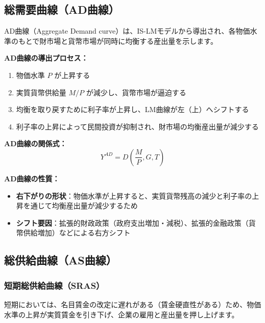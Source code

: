 \documentclass[
  japanese,
  lualatex,
  ja=standard,
  12pt,
  a4paper]{ltjsarticle}
\providecommand{\tightlist}{%
  \setlength{\itemsep}{0pt}\setlength{\parskip}{0pt}}
\begin{document}
\subsection{総需要曲線（AD曲線）}\label{ux7dcfux9700ux8981ux66f2ux7ddaadux66f2ux7dda}

AD曲線（Aggregate Demand
curve）は、IS-LMモデルから導出され、各物価水準のもとで財市場と貨幣市場が同時に均衡する産出量を示します。


\textbf{AD曲線の導出プロセス：}

\begin{enumerate}
\def\labelenumi{\arabic{enumi}.}
\tightlist
\item
  物価水準 \(P\) が上昇する
\item
  実質貨幣供給量 \(M/P\) が減少し、貨幣市場が逼迫する
\item
  均衡を取り戻すために利子率が上昇し、LM曲線が左（上）へシフトする
\item
  利子率の上昇によって民間投資が抑制され、財市場の均衡産出量が減少する
\end{enumerate}


\textbf{AD曲線の関係式：} \[
Y^{AD}=D\left(\frac{M}{P}, G, T\right)
\]


\textbf{AD曲線の性質：}

\begin{itemize}
\tightlist
\item
  \textbf{右下がりの形状}：物価水準が上昇すると、実質貨幣残高の減少と利子率の上昇を通じて均衡産出量が減少するため
\item
  \textbf{シフト要因}：拡張的財政政策（政府支出増加・減税）、拡張的金融政策（貨幣供給増加）などによる右方シフト
\end{itemize}

\subsection{総供給曲線（AS曲線）}\label{ux7dcfux4f9bux7d66ux66f2ux7ddaasux66f2ux7dda}

\subsubsection{短期総供給曲線（SRAS）}\label{ux77edux671fux7dcfux4f9bux7d66ux66f2ux7ddasras}

短期においては、名目賃金の改定に遅れがある（賃金硬直性がある）ため、物価水準の上昇が実質賃金を引き下げ、企業の雇用と産出量を押し上げます。
\end{document}
